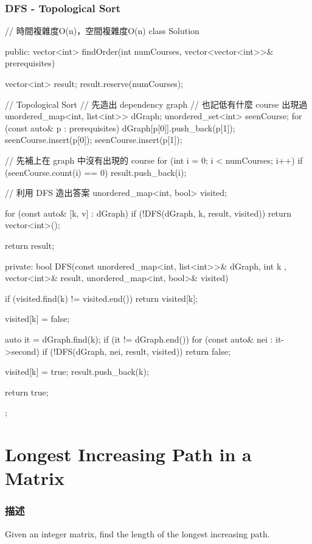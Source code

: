 \subsubsection{DFS - Topological Sort}
\begin{Code}
// 時間複雜度O(n)，空間複雜度O(n)
class Solution {
public:
    vector<int> findOrder(int numCourses, vector<vector<int>>& prerequisites) {
        vector<int> result; result.reserve(numCourses);

        // Topological Sort
        // 先造出 dependency graph
        // 也記低有什麼 course 出現過
        unordered_map<int, list<int>> dGraph;
        unordered_set<int> seenCourse;
        for (const auto& p : prerequisites)
        {
            dGraph[p[0]].push_back(p[1]);
            seenCourse.insert(p[0]);
            seenCourse.insert(p[1]);
        }

        // 先補上在 graph 中沒有出現的 course
        for (int i = 0; i < numCourses; i++)
            if (seenCourse.count(i) == 0) result.push_back(i);

        // 利用 DFS 造出答案
        unordered_map<int, bool> visited;

        for (const auto& [k, v] : dGraph)
        {
            if (!DFS(dGraph, k, result, visited)) return vector<int>();
        }

        return result;
    }
private:
    bool DFS(const unordered_map<int, list<int>>& dGraph, int k
             , vector<int>& result, unordered_map<int, bool>& visited)
    {
        if (visited.find(k) != visited.end()) return visited[k];

        visited[k] = false;

        auto it = dGraph.find(k);
        if (it != dGraph.end())
        {
            for (const auto& nei : it->second)
            {
                if (!DFS(dGraph, nei, result, visited)) return false;
            }
        }

        visited[k] = true;
        result.push_back(k);

        return true;
    }
};
\end{Code}

\section{Longest Increasing Path in a Matrix} %
\label{sec:longest-increasing-path-in-a-matrix}


\subsubsection{描述}
Given an integer matrix, find the length of the longest increasing path.

